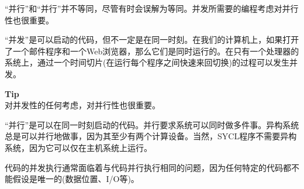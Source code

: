 “并行”和“并行”并不等同，尽管有时会误解为等同。并发所需要的编程考虑对并行性也很重要。\par

“并发”是可以启动的代码，但不一定是在同一时刻。在我们的计算机上，如果打开了一个邮件程序和一个Web浏览器，那么它们是同时运行的。在只有一个处理器的系统上，通过一个时间切片(在运行每个程序之间快速来回切换)的过程可以发生并发。\par

\begin{tcolorbox}[colback=blue!5!white,colframe=blue!75!black]
\textbf{Tip} \\
对并发性的任何考虑，对并行性也很重要。
\end{tcolorbox}

“并行”是可以在同一时刻启动的代码。并行要求系统可以同时做多件事。异构系统总是可以并行地做事，因为其至少有两个计算设备。当然，SYCL程序不需要异构系统，因为它可以仅在主机系统上运行。\par

代码的并发执行通常面临着与代码并行执行相同的问题，因为任何特定的代码都不能假设是唯一的(数据位置、I/O等)。\par









